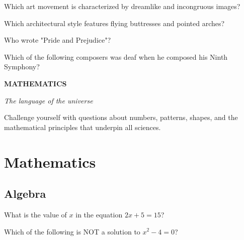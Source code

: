 \documentclass[12pt,a4paper]{book}
\renewcommand{\sectioncover}[3]{%
  \cleardoublepage
  \thispagestyle{empty}
  \begin{center}
    \vspace*{2cm}
    {\huge\bfseries\textcolor{questblue}{#1}\par}
    \vspace{0.7cm}
    {\Large\textit{#2}\par}
    \vspace{1.2cm}
    \begin{tcolorbox}[
      enhanced,
      colback=white,
      colframe=questorange,
      arc=5mm,
      boxrule=0.5mm,
      width=0.7\textwidth,
      halign=center,
      valign=center,
      height=5cm
    ]
      \begin{center}
        {\large #3\par}
      \end{center}
    \end{tcolorbox}
    \vspace{1.5cm}
  \end{center}
  \cleardoublepage
}
\begin{document}
\begin{enhancedmcq}{Which art movement is characterized by dreamlike and incongruous images?}
\end{enhancedmcq}

\begin{enhancedmcq}[Architecture]{Which architectural style features flying buttresses and pointed arches?}
\end{enhancedmcq}

\begin{enhancedmcq}[Literature]{Who wrote "Pride and Prejudice"?}
\end{enhancedmcq}

\begin{enhancedmcq}[Music]{Which of the following composers was deaf when he composed his Ninth Symphony?}
\end{enhancedmcq}

\sectioncover{MATHEMATICS}{The language of the universe}{Challenge yourself with questions about numbers, patterns, shapes, and the mathematical principles that underpin all sciences.}

\chapter{Mathematics}
\section{Algebra}

\begin{enhancedmcq}{What is the value of $x$ in the equation $2x + 5 = 15$?}
\end{enhancedmcq}

\begin{enhancedmcq}{Which of the following is NOT a solution to $x^2 - 4 = 0$?}
\end{enhancedmcq}
\end{document}

